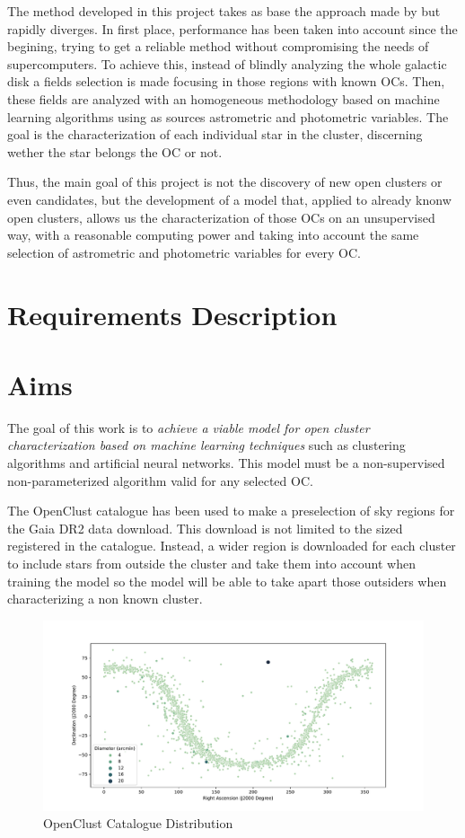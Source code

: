 \documentclass[11pt, a4paper, english]{book}
\begin{document}
The method developed in this project takes as base the approach made by \citeauthor{castro2020hunting} but rapidly diverges.
In first place, performance has been taken into account since the begining, trying to get a reliable method without compromising the
needs of supercomputers.
To achieve this, instead of blindly analyzing the whole galactic disk a fields selection is made focusing in those regions with known OCs.
Then, these fields are analyzed with an homogeneous methodology based on machine learning algorithms using as sources astrometric and
photometric variables. The goal is the characterization of each individual star in the cluster, discerning wether the star belongs the OC
or not.

Thus, the main goal of this project is not the discovery of new open clusters or even candidates, but the development of a model that,
applied to already knonw open clusters, allows us the characterization of those OCs on an unsupervised way, with a reasonable computing
power and taking into account the same selection of astrometric and photometric variables for every OC.

\chapter{Requirements Description}

\chapter{Aims}

The goal of this work is to \emph{achieve a viable model for open cluster characterization based on machine learning techniques}
such as clustering algorithms and artificial neural networks.
This model must be a non-supervised non-parameterized algorithm valid for any selected OC.

The OpenClust catalogue \cite[]{dias2002new} has been used to make a preselection of sky regions for the Gaia DR2 data download.
This download is not limited to the sized registered in the catalogue. Instead, a wider region is downloaded for each cluster to include
stars from outside the cluster and take them into account when training the model so the model will be able to take apart those outsiders
when characterizing a non known cluster.

\begin{figure}[htbp]
  \centering
  \includegraphics[width=\columnwidth]{../figures/openclust_catalogue.pdf}
  \caption{OpenClust Catalogue Distribution}
\end{figure}
\end{document}
